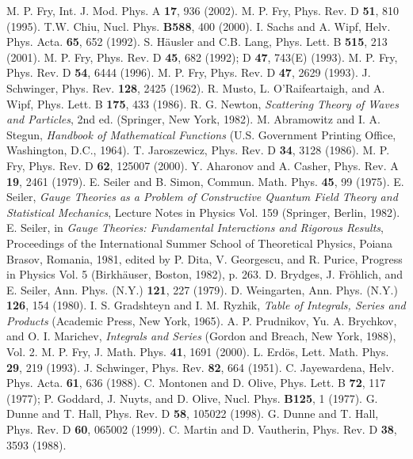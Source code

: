 \documentclass[a4paper,twocolumn,showpacs,preprintnumbers,amsmath,amssymb]{revtex4}
\begin{document}
\begin{thebibliography}{99}
M. P. Fry, Int. J. Mod. Phys. A \textbf{17}, 936 (2002).
M. P. Fry, Phys. Rev. D \textbf{51}, 810 (1995).
T.W. Chiu, Nucl. Phys. \textbf{B588}, 400 (2000).
I. Sachs and A. Wipf, Helv. Phys. Acta. \textbf{65}, 652 (1992).
S. H\"{a}usler and C.B. Lang, Phys. Lett. B \textbf{515}, 213 (2001).
M. P. Fry, Phys. Rev. D \textbf{45}, 682 (1992); D \textbf{47}, 743(E) (1993).
M. P. Fry, Phys. Rev. D \textbf{54}, 6444 (1996).
M. P. Fry, Phys. Rev. D \textbf{47}, 2629 (1993).
J. Schwinger, Phys. Rev. \textbf{128}, 2425 (1962).
R. Musto, L. O'Raifeartaigh, and A. Wipf, Phys. Lett. B \textbf{175},
433 (1986).
R. G. Newton, \emph{Scattering Theory of Waves and Particles}, 2nd
ed. (Springer, New York, 1982).
M. Abramowitz and I. A. Stegun, \emph{Handbook of Mathematical
Functions} (U.S. Government Printing Office, Washington, D.C., 1964).
T. Jaroszewicz, Phys. Rev. D \textbf{34}, 3128 (1986).
M. P. Fry, Phys. Rev. D \textbf{62}, 125007 (2000).
Y. Aharonov and A. Casher, Phys. Rev. A \textbf{19}, 2461 (1979).
E. Seiler and B. Simon, Commun. Math. Phys. \textbf{45}, 99 (1975).
E. Seiler, \emph{Gauge Theories as a Problem of Constructive Quantum Field
Theory and Statistical Mechanics}, Lecture Notes in Physics Vol. 159
(Springer, Berlin, 1982).
E. Seiler, in \emph{Gauge Theories: Fundamental Interactions and Rigorous
Results}, Proceedings of the International Summer School of Theoretical
Physics, Poiana Brasov, Romania, 1981, edited by P. Dita,
V. Georgescu, and R. Purice, Progress in Physics Vol. 5 (Birkh\"{a}user,
Boston, 1982), p. 263.
D. Brydges, J. Fr\"{o}hlich, and E. Seiler, Ann. Phys. (N.Y.)
\textbf{121}, 227 (1979).
D. Weingarten, Ann. Phys. (N.Y.) \textbf{126}, 154 (1980).
I. S. Gradshteyn and I. M. Ryzhik, \emph{Table of Integrals, Series
and Products} (Academic Press, New York, 1965).
A. P. Prudnikov, Yu. A. Brychkov, and O. I. Marichev, \emph{Integrals
and Series} (Gordon and Breach, New York, 1988), Vol. 2.
M. P. Fry, J. Math. Phys. \textbf{41}, 1691 (2000).
L. Erd\"{o}s, Lett. Math. Phys. \textbf{29}, 219 (1993).
J. Schwinger, Phys. Rev. \textbf{82}, 664 (1951).
C. Jayewardena, Helv. Phys. Acta. \textbf{61}, 636 (1988).
C. Montonen and D. Olive, Phys. Lett. B \textbf{72}, 117 (1977);
P. Goddard, J. Nuyts, and D. Olive, Nucl. Phys. \textbf{B125}, 1
(1977).
G. Dunne and T. Hall, Phys. Rev. D \textbf{58}, 105022 (1998).
G. Dunne and T. Hall, Phys. Rev. D \textbf{60}, 065002 (1999).
C. Martin and D. Vautherin, Phys. Rev. D \textbf{38}, 3593 (1988).
\end{thebibliography}
\end{document}

